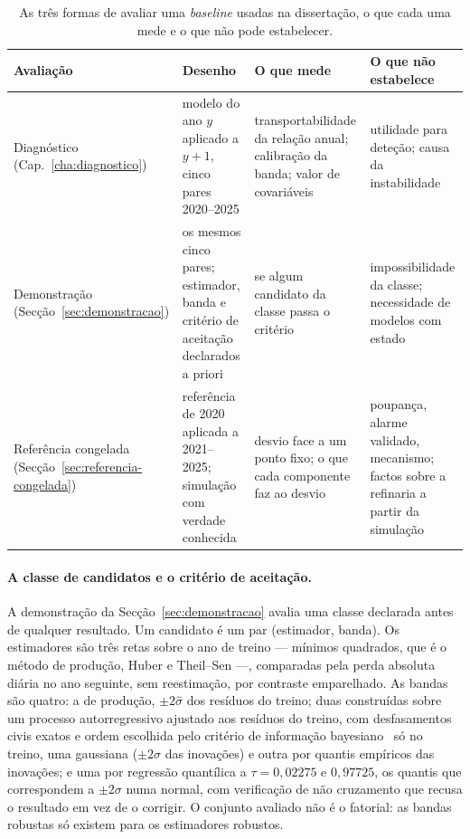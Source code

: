 \begin{table}[htbp]
  \centering
  \caption[Os três estimandos deste capítulo]{As três formas de avaliar uma
  \emph{baseline} usadas na dissertação, o que cada uma mede e o que não
  pode estabelecer.}
  \label{tab:estimandos}
  \small
  \ntzebra
  \begin{tabular}{p{3.0cm}p{3.6cm}p{3.6cm}p{3.4cm}}
    \toprule
    \textbf{Avaliação}  &  \textbf{Desenho}  &  \textbf{O que mede}  &  \textbf{O que não estabelece} \\
    \midrule
    Diagnóstico (Cap.~\ref{cha:diagnostico}) & modelo do ano $y$ aplicado a $y{+}1$, cinco pares 2020--2025 & transportabilidade da relação anual; calibração da banda; valor de covariáveis & utilidade para deteção; causa da instabilidade \\
    Demonstração (Secção~\ref{sec:demonstracao}) & os mesmos cinco pares; estimador, banda e critério de aceitação declarados a priori & se algum candidato da classe passa o critério & impossibilidade da classe; necessidade de modelos com estado \\
    Referência congelada (Secção~\ref{sec:referencia-congelada}) & referência de 2020 aplicada a 2021--2025; simulação com verdade conhecida & desvio face a um ponto fixo; o que cada componente faz ao desvio & poupança, alarme validado, mecanismo; factos sobre a refinaria a partir da simulação \\
    \bottomrule
  \end{tabular}
\end{table}

\paragraph{A classe de candidatos e o critério de aceitação.} A demonstração
da Secção~\ref{sec:demonstracao} avalia uma classe declarada antes de
qualquer resultado. Um candidato é um par (estimador, banda). Os estimadores
são três retas sobre o ano de treino --- mínimos quadrados, que é o método de
produção, Huber e Theil--Sen ---, comparadas pela perda absoluta diária no
ano seguinte, sem reestimação, por contraste emparelhado. As bandas são
quatro: a de produção, $\pm2\hat\sigma$ dos resíduos do treino; duas
construídas sobre um processo autorregressivo ajustado aos resíduos do
treino, com desfasamentos civis exatos e ordem escolhida pelo critério de
informação bayesiano~\cite{Schwarz1978} só no treino, uma gaussiana
($\pm2\hat\sigma$ das inovações) e outra por quantis empíricos das
inovações; e uma por regressão quantílica a $\tau = 0{,}02275$ e
$0{,}97725$, os quantis que correspondem a $\pm2\sigma$ numa normal, com
verificação de não cruzamento que recusa o resultado em vez de o corrigir.
O conjunto avaliado não é o fatorial: as bandas robustas só existem para os
estimadores robustos.

